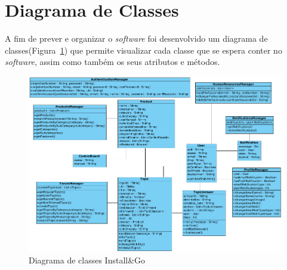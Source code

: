 \section{Diagrama de Classes}

A fim de prever e organizar o \textit{software} foi desenvolvido um diagrama de classes(Figura~\ref{fig:22}) que permite visualizar cada classe que se espera conter no \textit{software}, assim como também os seus atributos e métodos.

\begin{figure}[htb]
  \centering
  
  \includegraphics[width=\textwidth]{images/diagramas/diagrama_classes.png}
  \caption{Diagrama de classes Install\&Go}
  \label{fig:22}
\end{figure}
